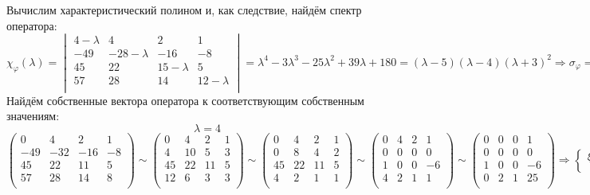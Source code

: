 \documentclass{article}
\newcommand{\la}{\lambda}
\begin{document}
\begin{center}
Вычислим характеристический полином и, как следствие, найдём спектр оператора:
$$\chi_\varphi(\la) = \begin{vmatrix}
4-\la & 4 & 2 & 1 \\
-49 & -28-\la & -16 & -8 \\
45 & 22 & 15-\la & 5 \\
57 & 28 & 14 & 12-\la \\
\end{vmatrix} = \la^4-3\la^3-25\la^2+39\la+180 = (\la - 5)(\la - 4)(\la + 3)^2\Rightarrow \sigma_\varphi = \left\{4^{(1)}, 5^{(1)}, -3^{(2)}\right\}$$
Найдём собственные вектора оператора к соответствующим собственным значениям:
$$\la = 4$$
$$\begin{pmatrix}
0 & 4 & 2 & 1 \\
-49 & -32 & -16 & -8 \\
45 & 22 & 11 & 5 \\
57 & 28 & 14 & 8 \\
\end{pmatrix} \sim \begin{pmatrix}
0 & 4 & 2 & 1 \\
4 & 10 & 5 & 3 \\
45 & 22 & 11 & 5 \\
12 & 6 & 3 & 3 \\
\end{pmatrix} \sim \begin{pmatrix}
0 & 4 & 2 & 1 \\
0 & 8 & 4 & 2 \\
45 & 22 & 11 & 5 \\
4 & 2 & 1 & 1 \\
\end{pmatrix} \sim \begin{pmatrix}
0 & 4 & 2 & 1 \\
0 & 0 & 0 & 0 \\
1 & 0 & 0 & -6 \\
4 & 2 & 1 & 1 \\
\end{pmatrix} \sim \begin{pmatrix}
0 & 0 & 0 & 1 \\
0 & 0 & 0 & 0 \\
1 & 0 & 0 & -6 \\
0 & 2 & 1 & 25 \\
\end{pmatrix} \Rightarrow \begin{cases}
\xi_1 = \xi_4 = 0 \\

\end{cases}$$
\end{center}
\end{document}
